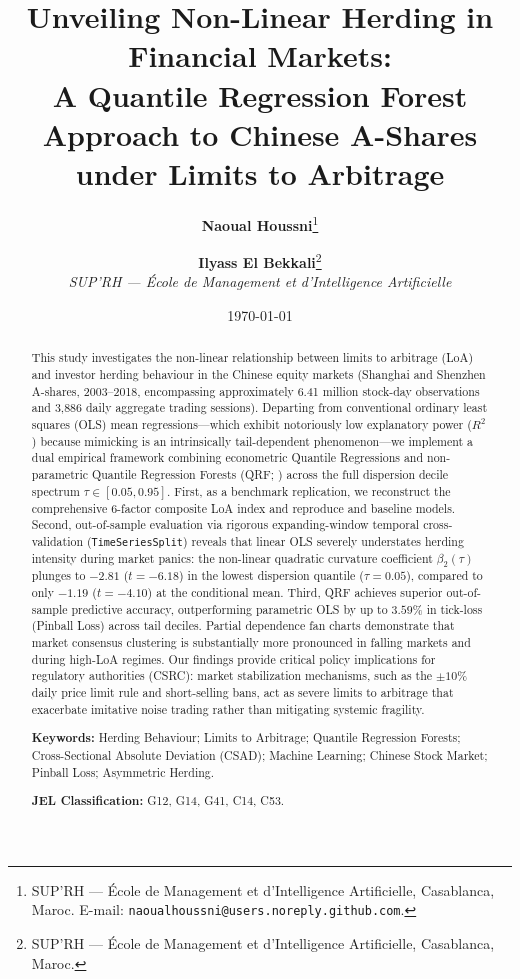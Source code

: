 \documentclass[12pt, a4paper]{article}
\title{%
  \textbf{Unveiling Non-Linear Herding in Financial Markets:}\\[6pt]
  \textbf{A Quantile Regression Forest Approach to Chinese A-Shares}\\[6pt]
  \textbf{under Limits to Arbitrage}
}
\author{%
  \textbf{Naoual Houssni}\thanks{SUP'RH --- École de Management et d'Intelligence Artificielle, Casablanca, Maroc. E-mail: \texttt{naoualhoussni@users.noreply.github.com}.}
  \quad\and\quad
  \textbf{Ilyass El Bekkali}\thanks{SUP'RH --- École de Management et d'Intelligence Artificielle, Casablanca, Maroc.}
  \\[10pt]
  \textit{SUP'RH --- École de Management et d'Intelligence Artificielle}
}
\date{\today}
\begin{document}
\maketitle

\begin{abstract}
\noindent
This study investigates the non-linear relationship between limits to arbitrage (LoA) and investor herding behaviour in the Chinese equity markets (Shanghai and Shenzhen A-shares, 2003--2018, encompassing approximately 6.41 million stock-day observations and 3,886 daily aggregate trading sessions). Departing from conventional ordinary least squares (OLS) mean regressions---which exhibit notoriously low explanatory power ($R^2$) because mimicking is an intrinsically tail-dependent phenomenon---we implement a dual empirical framework combining econometric Quantile Regressions \citep{Koenker1978} and non-parametric Quantile Regression Forests (QRF; \citealt{Meinshausen2006}) across the full dispersion decile spectrum $\tau \in [0.05, 0.95]$. First, as a benchmark replication, we reconstruct the comprehensive 6-factor composite LoA index and reproduce \citet{Christie1995} and \citet{Chang2000} baseline models. Second, out-of-sample evaluation via rigorous expanding-window temporal cross-validation (\texttt{TimeSeriesSplit}) reveals that linear OLS severely understates herding intensity during market panics: the non-linear quadratic curvature coefficient $\beta_2(\tau)$ plunges to $-2.81$ ($t=-6.18$) in the lowest dispersion quantile ($\tau=0.05$), compared to only $-1.19$ ($t=-4.10$) at the conditional mean. Third, QRF achieves superior out-of-sample predictive accuracy, outperforming parametric OLS by up to $3.59\%$ in tick-loss (Pinball Loss) across tail deciles. Partial dependence fan charts demonstrate that market consensus clustering is substantially more pronounced in falling markets and during high-LoA regimes. Our findings provide critical policy implications for regulatory authorities (CSRC): market stabilization mechanisms, such as the $\pm10\%$ daily price limit rule and short-selling bans, act as severe limits to arbitrage that exacerbate imitative noise trading rather than mitigating systemic fragility.

\bigskip
\noindent\textbf{Keywords:} Herding Behaviour; Limits to Arbitrage; Quantile Regression Forests; Cross-Sectional Absolute Deviation (CSAD); Machine Learning; Chinese Stock Market; Pinball Loss; Asymmetric Herding.

\medskip
\noindent\textbf{JEL Classification:} G12, G14, G41, C14, C53.
\end{abstract}
\end{document}
